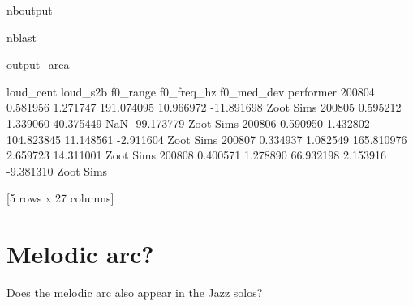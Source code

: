 \documentclass[letterpaper,10pt,english]{sphinxmanual}
\begin{document}
\begin{sphinxuseclass}{nboutput}
\begin{sphinxuseclass}{nblast}
{\begin{sphinxuseclass}{output_area}
\begin{sphinxuseclass}{}
\begin{sphinxVerbatim}[commandchars=\\\{\}]
        loud\_cent  loud\_s2b    f0\_range  f0\_freq\_hz  f0\_med\_dev  performer
200804   0.581956  1.271747  191.074095   10.966972  -11.891698  Zoot Sims
200805   0.595212  1.339060   40.375449         NaN  -99.173779  Zoot Sims
200806   0.590950  1.432802  104.823845   11.148561   -2.911604  Zoot Sims
200807   0.334937  1.082549  165.810976    2.659723   14.311001  Zoot Sims
200808   0.400571  1.278890   66.932198    2.153916   -9.381310  Zoot Sims

[5 rows x 27 columns]
\end{sphinxVerbatim}



\end{sphinxuseclass}
\end{sphinxuseclass}
}

\end{sphinxuseclass}
\end{sphinxuseclass}

\section{Melodic arc?}
\label{\detokenize{04_jazz_solos:Melodic-arc?}}
\sphinxAtStartPar
Does the melodic arc also appear in the Jazz solos?
\end{document}
